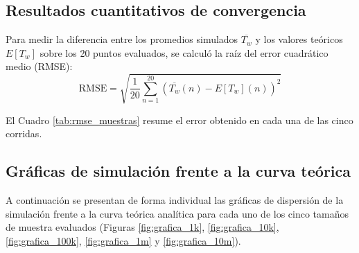 \documentclass[11pt, a4paper]{article}
\begin{document}
\subsection{Resultados cuantitativos de convergencia}
Para medir la diferencia entre los promedios simulados $\overline{T_w}$ y los valores teóricos $E[T_w]$ sobre los 20 puntos evaluados, se calculó la raíz del error cuadrático medio (RMSE):
\begin{equation}
\text{RMSE} = \sqrt{\frac{1}{20} \sum_{n=1}^{20} \left(\overline{T_w}(n) - E[T_w](n)\right)^2}
\end{equation}

El Cuadro \ref{tab:rmse_muestras} resume el error obtenido en cada una de las cinco corridas.

\begin{table}[H]
\centering
{}
\caption{Evolución del error cuadrático medio en función del tamaño de muestra para $k=3$.}
\label{tab:rmse_muestras}
\end{table}

\subsection{Gráficas de simulación frente a la curva teórica}
A continuación se presentan de forma individual las gráficas de dispersión de la simulación frente a la curva teórica analítica para cada uno de los cinco tamaños de muestra evaluados (Figuras \ref{fig:grafica_1k}, \ref{fig:grafica_10k}, \ref{fig:grafica_100k}, \ref{fig:grafica_1m} y \ref{fig:grafica_10m}).
\end{document}
